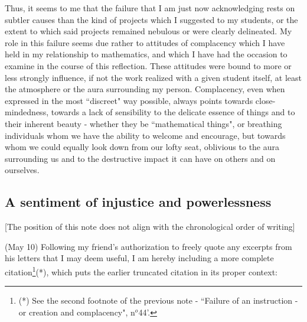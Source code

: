 Thus, it seems to me that the failure that I am just now acknowledging rests on subtler causes than the kind of projects which I suggested to my students, or the extent to which said projects remained nebulous or were clearly delineated. My role in this failure seems due rather to attitudes of complacency which I have held in my relationship to mathematics, and which I have had the occasion to examine in the course of this reflection. These attitudes were bound to more or less strongly influence, if not the work realized with a given student itself, at least the atmosphere or the aura surrounding my person. Complacency, even when expressed in the most ``discreet" way possible, always points towards close-mindedness, towards a lack of sensibility to the delicate essence of things and to their inherent beauty - whether they be ``mathematical things", or breathing individuals whom we have the ability to welcome and encourage, but towards whom we could equally look down from our lofty seat, oblivious to the aura surrounding us and to the destructive impact it can have on others and on ourselves.

\subsection{A sentiment of injustice and powerlessness}

 [The position of this note does not align with the chronological order of writing]

(May 10) Following my friend's authorization to freely quote any excerpts from his letters that I may deem useful, I am hereby including a more complete citation\footnote{(*) See the second footnote of the previous note - ``Failure of an instruction - or creation and complacency", n$^o$44'.}(*), which puts the earlier truncated citation in its proper context:

